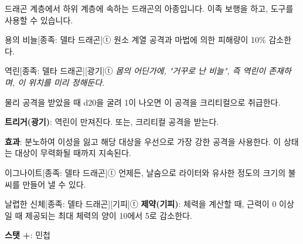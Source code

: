\documentclass{report}
\begin{document}
	드래곤 계층에서 하위 계층에 속하는 드래곤의 아종입니다. 이족 보행을 하고, 도구를 사용할 수 있습니다.
	
	\begin{story}{용의 비늘}{[종족: 델타 드래곤]ⓣ}
		원소 계열 공격과 마법에 의한 피해량이 10\% 감소한다.
		
	\end{story}
	
	\begin{story}{역린}{[종족: 델타 드래곤][광기]ⓣ}
		\textit{몸의 어딘가에, "거꾸로 난 비늘", 즉 \emph{역린}이 존재하며, 이 위치를 미리 정해둔다.}
		
		물리 공격을 받았을 때 d20을 굴려 1이 나오면 이 공격을 크리티컬으로 취급한다.
		
		\textbf{트리거(광기)}: 역린이 만져진다. 또는, 크리티컬 공격을 받는다.
		
		\textbf{효과}: 분노하여 이성을 잃고 해당 대상을 우선으로 가장 강한 공격을 사용한다. 이 상태는 대상이 무력화될 때까지 지속된다.
		
	\end{story}
	
	\begin{story}{이그나이트}{[종족: 델타 드래곤]ⓣ}
		언제든, 날숨으로 라이터와 유사한 정도의 크기의 불씨를 만들어 낼 수 있다.
		
	\end{story}
	
	\begin{story}{날렵한 신체}{[종족: 델타 드래곤][기피]ⓣ}
		\textbf{제약(기피)}: 체력을 계산할 때, 근력이 0 이상일 때 제공되는 최대 체력의 양이 10에서 5로 감소한다.
		
		\textbf{스탯 +}: 민첩
		
	\end{story}
\end{document}
